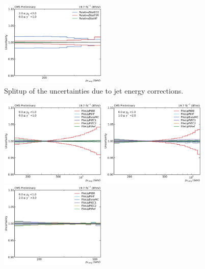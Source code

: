 \begin{figure}[htbp]
    \includegraphics[width=0.45\textwidth]{figures/measurement/jec_relunc_4_yb2ys0.pdf}
    \caption{Splitup of the uncertainties due to jet energy corrections.}
    \label{fig:jec_relunc_4}
\end{figure}

\begin{figure}[htbp]
    \centering
    \includegraphics[width=0.45\textwidth]{figures/measurement/jec_relunc_5_yb0ys0.pdf}\hfill
    \includegraphics[width=0.45\textwidth]{figures/measurement/jec_relunc_5_yb0ys1.pdf}
    \includegraphics[width=0.45\textwidth]{figures/measurement/jec_relunc_5_yb0ys2.pdf}\hfill

\end{figure}
